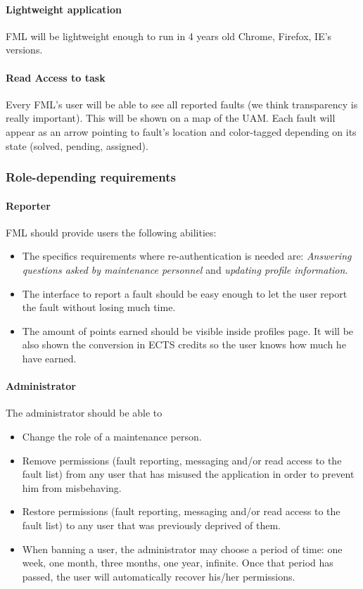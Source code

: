 \paragraph{Lightweight application} FML will be lightweight enough to run in 4 years old Chrome, Firefox, IE's versions.

\paragraph{Read Access to task} Every FML's user will be able to see all reported faults (we think transparency is really important). This will be shown on a map of the UAM. Each fault will appear as an arrow pointing to fault's location and color-tagged depending on its state (solved, pending, assigned).

\subsubsection{Role-depending requirements}

\paragraph{Reporter} FML should provide users the following abilities:
\begin{itemize}
\item The specifics requirements where re-authentication is needed are: \textit{Answering questions asked by maintenance personnel}   \label{Specifics_Secure_Requirements_for_user} and \textit{updating profile information}.
\item The interface to report a fault should be easy enough to let the user report the fault without losing much time.
\item The amount of points earned should be visible inside profiles page. It will be also shown the conversion in ECTS credits so the user knows how much he have earned.

\end{itemize}

\paragraph{Administrator} The administrator should be able to

\begin{itemize}
\item Change the role of a maintenance person.
\item Remove permissions (fault reporting, messaging and/or read access to the fault list) from any user that has misused the application in order to prevent him from misbehaving.
\item Restore permissions (fault reporting, messaging and/or read access to the fault list) to any user that was previously deprived of them.
\item When banning a user, the administrator may choose a period of time: one week, one month, three months, one year, infinite. Once that period has passed, the user will automatically recover his/her permissions.
\end{itemize}
